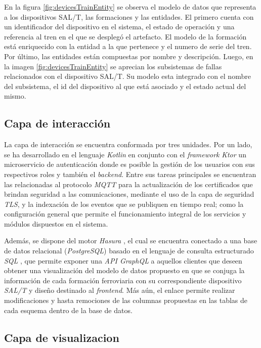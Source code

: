 \documentclass[a4paper]{IEEEtran}
\begin{document}
En la figura \ref{fig:devicesTrainEntity} se observa el modelo de datos que representa a los dispositivos SAL/T, las formaciones y las entidades. 
El primero cuenta con un identificador del dispositivo en el sistema, el estado de operación y una referencia al tren en el que se desplegó el artefacto. 
El modelo de la formación está enriquecido con la entidad a la que pertenece y el numero de serie del tren. 
Por último, las entidades están compuestas por nombre y descripción.
Luego, en la imagen \ref{fig:devicesTrainEntity} se aprecian los subsistemas de fallas relacionados con el dispositivo SAL/T.
Su modelo esta integrado con el nombre del subsistema, el id del dispositivo al que está asociado y el estado actual del mismo. 

\subsection{Capa de interacción}

La capa de interacción se encuentra conformada por tres unidades. Por un lado, se ha desarrollado en el lenguaje \textit{Kotlin} \cite{b12} en conjunto con el \textit{framework} \textit{Ktor} \cite{b13} un microservicio de autenticación donde es posible la gestión de los usuarios con sus respectivos roles y también el \textit{backend}. Entre sus tareas principales se encuentran las relacionadas al protocolo \textit{MQTT} para la actualización de los certificados que brindan seguridad a las comunicaciones, mediante el uso de la capa de seguridad \textit{TLS}, y la indexación de los eventos que se publiquen en tiempo real; como la configuración general que permite el funcionamiento integral de los servicios y módulos dispuestos en el sistema.

Además, se dispone del motor \textit{Hasura} \cite{b14}, el cual se encuentra conectado a una base de datos relacional (\textit{PostgreSQL}) basado en el lenguaje de consulta estructurado \textit{SQL} \cite{b15} , que permite exponer una \textit{API GraphQL} \cite{b16} a aquellos clientes que deseen obtener una visualización del modelo de datos propuesto en que se conjuga la información de cada formación ferroviaria con su correspondiente dispositivo \textit{SAL/T} y diseño destinado al \textit{frontend}. Más aún, el enlace permite realizar modificaciones y hasta remociones de las columnas propuestas en las tablas de cada esquema dentro de la base de datos.


\subsection{Capa de visualizacion}
\end{document}
